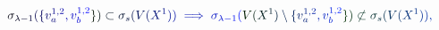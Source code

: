 \documentclass[12pt]{article}
\begin{document}
\makeatletter
\renewcommand*{\@textcolor}[3]{%
  \protect\leavevmode
  \begingroup
    \color#1{#2}#3%
  \endgroup
}
\makeatother
\begin{displaymath}
\mathcolor[RGB]{0,0,15}{\sigma} _ { \mathcolor[RGB]{0,0,30}{\lambda} \mathcolor[RGB]{0,0,45}{-} \mathcolor[RGB]{0,0,60}{1} } \mathcolor[RGB]{0,0,75}{(} \mathcolor[RGB]{0,0,90}{\{} \mathcolor[RGB]{0,0,105}{v} _ { \mathcolor[RGB]{0,0,120}{a} } ^ { \mathcolor[RGB]{0,0,135}{1} \mathcolor[RGB]{0,0,150}{,} \mathcolor[RGB]{0,0,165}{2} } \mathcolor[RGB]{0,0,180}{,} \mathcolor[RGB]{0,0,195}{v} _ { \mathcolor[RGB]{0,0,210}{b} } ^ { \mathcolor[RGB]{0,0,225}{1} \mathcolor[RGB]{0,0,240}{,} \mathcolor[RGB]{0,0,255}{2} } \mathcolor[RGB]{0,15,0}{\}} \mathcolor[RGB]{0,15,15}{)} \mathcolor[RGB]{0,15,30}{\subset} \mathcolor[RGB]{0,15,45}{\sigma} _ { \mathcolor[RGB]{0,15,60}{s} } \mathcolor[RGB]{0,15,75}{(} \mathcolor[RGB]{0,15,90}{V} \mathcolor[RGB]{0,15,105}{(} \mathcolor[RGB]{0,15,120}{X} ^ { \mathcolor[RGB]{0,15,135}{1} } \mathcolor[RGB]{0,15,150}{)} \mathcolor[RGB]{0,15,165}{)} \mathcolor[RGB]{0,15,180}{\implies} \mathcolor[RGB]{0,15,195}{\sigma} _ { \mathcolor[RGB]{0,15,210}{\lambda} \mathcolor[RGB]{0,15,225}{-} \mathcolor[RGB]{0,15,240}{1} } \mathcolor[RGB]{0,15,255}{(} \mathcolor[RGB]{0,30,0}{V} \mathcolor[RGB]{0,30,15}{(} \mathcolor[RGB]{0,30,30}{X} ^ { \mathcolor[RGB]{0,30,45}{1} } \mathcolor[RGB]{0,30,60}{)} \mathcolor[RGB]{0,30,75}{\setminus} \mathcolor[RGB]{0,30,90}{\{} \mathcolor[RGB]{0,30,105}{v} _ { \mathcolor[RGB]{0,30,120}{a} } ^ { \mathcolor[RGB]{0,30,135}{1} \mathcolor[RGB]{0,30,150}{,} \mathcolor[RGB]{0,30,165}{2} } \mathcolor[RGB]{0,30,180}{,} \mathcolor[RGB]{0,30,195}{v} _ { \mathcolor[RGB]{0,30,210}{b} } ^ { \mathcolor[RGB]{0,30,225}{1} \mathcolor[RGB]{0,30,240}{,} \mathcolor[RGB]{0,30,255}{2} } \mathcolor[RGB]{0,45,0}{\}} \mathcolor[RGB]{0,45,15}{)} \mathcolor[RGB]{0,45,30}{\not\subset} \mathcolor[RGB]{0,45,45}{\sigma} _ { \mathcolor[RGB]{0,45,60}{s} } \mathcolor[RGB]{0,45,75}{(} \mathcolor[RGB]{0,45,90}{V} \mathcolor[RGB]{0,45,105}{(} \mathcolor[RGB]{0,45,120}{X} ^ { \mathcolor[RGB]{0,45,135}{1} } \mathcolor[RGB]{0,45,150}{)} \mathcolor[RGB]{0,45,165}{)} \mathcolor[RGB]{0,45,180}{,}
\end{displaymath}
\end{document}
